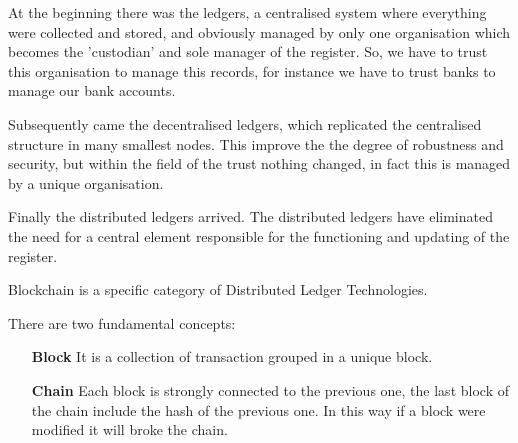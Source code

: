\documentclass{article}
\begin{document}
    At the beginning there was the ledgers, a centralised system where everything were collected and stored, and obviously managed by only one organisation which becomes the 'custodian' and sole manager of the register. So, we have to trust this organisation to manage this records, for instance we have to trust banks to manage our bank accounts.
    
    Subsequently came the decentralised ledgers, which replicated the centralised structure in many smallest nodes. This improve the the degree of robustness and security, but within the field of the trust nothing changed, in fact this is managed by a unique organisation.
    
    Finally the distributed ledgers arrived. The distributed ledgers have eliminated the need for a central element responsible for the functioning and updating of the register.
    
    Blockchain is a specific category of Distributed Ledger Technologies.
    
    There are two fundamental concepts:
    \begin{itemize}
        \item[\textbf{Block}] It is a collection of transaction grouped in a unique block.
        \item[\textbf{Chain}] Each block is strongly connected to the previous one, the last block of the chain include the hash of the previous one. In this way if a block were modified it will broke the chain.
    \end{itemize}
    
\end{document}

